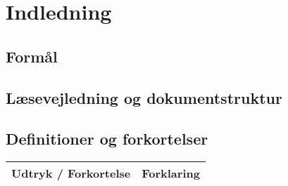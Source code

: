 	\chapter{Indledning}
	
	\section{Formål}
	
	\section{Læsevejledning og dokumentstruktur}

	\section{Definitioner og forkortelser}
	\begin{longtable}{ |p{} |p{}| } 
		\hline
		\textbf{Udtryk / Forkortelse} &  \textbf{Forklaring} \\
		\hline
	\end{longtable}